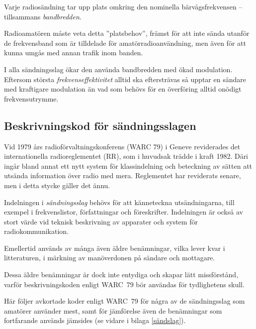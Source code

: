 Varje radiosändning tar upp plats omkring den nominella bärvågsfrekvensen --
tillsammans \emph{bandbredden}.

Radioamatören måste veta detta ''platsbehov'', främst för att inte sända utanför
de frekvensband som är tilldelade för amatörradioanvändning, men även för att
kunna umgås med annan trafik inom banden.

I alla sändningsslag ökar den använda bandbredden med ökad modulation.
Eftersom största \emph{frekvenseffektivitet} alltid ska eftersträvas så upptar
en sändare med kraftigare modulation än vad som behövs för en överföring alltid
onödigt frekvensutrymme.

\subsection{Beskrivningskod för sändningsslagen}
\label{modulation_beskrivningskod}

Vid 1979 års radioförvaltningskonferens (WARC 79) i Geneve reviderades det
internationella radioreglementet (RR), som i huvudsak trädde i kraft 1982.
Däri ingår bland annat ett nytt system för klassindelning och beteckning av
sätten att utsända information över radio med mera.
Reglementet har reviderats senare, men i detta stycke gäller det ännu.

Indelningen i \emph{sändningsslag} behövs för att känneteckna utsändningarna,
till exempel i frekvenslistor, författningar och föreskrifter.
Indelningen är också av stort värde vid teknisk beskrivning av apparater och
system för radiokommunikation.

Emellertid används av många även äldre benämningar, vilka lever kvar i
litteraturen, i märkning av manöverdonen på sändare och mottagare.

Dessa äldre benämningar är dock inte entydiga och skapar lätt missförstånd,
varför beskrivningskoden enligt WARC~79 bör användas för tydlighetens skull.

Här följer avkortade koder enligt WARC~79 för några av de sändningsslag som
amatörer använder mest, samt för jämförelse även de benämningar som fortfarande
används jämsides (se vidare i bilaga \ref{sändslag}).



